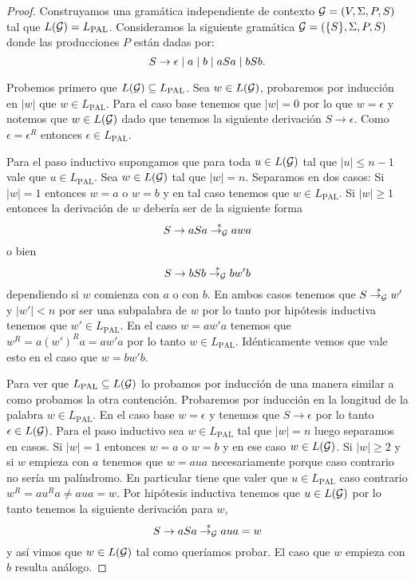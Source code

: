 \documentclass[tesis.tex]{subfiles}
\begin{document}
\begin{proof}
	Construyamos una gramática independiente de contexto ${\cal G} = (V, \Sigma, P, S)$ tal que $L({\cal G}) = L_{\text{PAL}}$.
	Consideramos la siguiente gramática ${\cal G}  =  (\{S\}, \Sigma, P, S )$ donde las producciones $P$ están dadas por:
	\begin{equation*}
		S  \to \epsilon \\ \mid a  \mid  b \\ \mid aSa \\ \mid bSb. \\
	\end{equation*}
		

	Probemos primero que $L({\cal G}) \subseteq L_{\text{PAL}}$.
	Sea $w \in L({\cal G})$, probaremos por inducción en $|w|$ que $w \in L_{\text{PAL}}$.
	Para el caso base tenemos que $|w|=0$ por lo que $w = \epsilon$ y notemos que
	$w \in L({\cal G})$ dado que tenemos la siguiente derivación $S \to \epsilon$.
	Como $\epsilon = \epsilon^R$ entonces $\epsilon \in L_{\text{PAL}}$.
	
	Para el paso inductivo supongamos que para toda $u \in L({\cal G})$ tal que $|u| \le n-1$ vale que $u \in L_{\text{PAL}}$.
	Sea $w \in L({\cal G})$ tal que $|w| = n$. 
	Separamos en dos casos:
	Si $|w| = 1$ entonces $w=a$ o $w = b$ y en tal caso tenemos que $w\in L_{\text{PAL}}$.
	Si $|w| \ge 1$ entonces la derivación de $w$ debería ser de la siguiente forma 
	\[
		S \to aSa \overset{*}{\to_{\cal G}} awa
	\]
	o bien 
	\[
		S \to bSb \overset{*}{\to_{\cal G}} bw'b
	\]
	dependiendo si $w$ comienza con $a$ o con $b$.
	En ambos casos tenemos que $S \overset{*}{\to_{\cal G}} w'$ y $|w'| < n$ por ser una subpalabra de $w$ por lo tanto por hipótesis inductiva tenemos que $w' \in L_{\text{PAL}}$.
	En el caso $w = aw'a$ tenemos que $w^R = a(w')^Ra = aw'a$ por lo tanto $w \in L_{\text{PAL}}$. 
	Idénticamente vemos que vale esto en el caso que $w = bw'b$.
	
	
	Para ver que $L_{\text{PAL}} \subseteq L({\cal G})$ lo probamos por inducción de una manera similar a como probamos la otra contención.
	Probaremos por inducción en la longitud de la palabra $w \in L_{\text{PAL}}$.
	En el caso base $w = \epsilon$ y tenemos que $S \to \epsilon$ por lo tanto $\epsilon \in L({\cal G})$.
	Para el paso inductivo sea $w \in L_{\text{PAL}}$ tal que $|w|=n$ luego separamos en casos.
	Si $|w| = 1$ entonces $w = a$ o $w = b$ y en ese caso $w \in L({\cal G})$.
	Si $|w| \ge 2$ y si $w$ empieza con $a$ tenemos que $w = aua$ necesariamente porque caso contrario no sería un palíndromo. 
	En particular tiene que valer que $u \in L_{\text{PAL}}$ caso contrario $w^R = au^Ra \neq aua = w$. 
	Por hipótesis inductiva tenemos que $u \in L({\cal G})$ por lo tanto tenemos la siguiente derivación para $w$,
	\[
		S \to aSa \overset{*}{\to_{\cal G}} aua = w
	\]
	y así vimos que $w \in L({\cal G})$ tal como queríamos probar.
	El caso que $w$ empieza con $b$ resulta análogo.
	
\end{proof}
\end{document}
